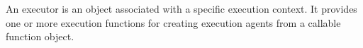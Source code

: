 An executor is an object associated with a specific execution context. It provides one or more execution functions for creating execution agents from a callable function object.